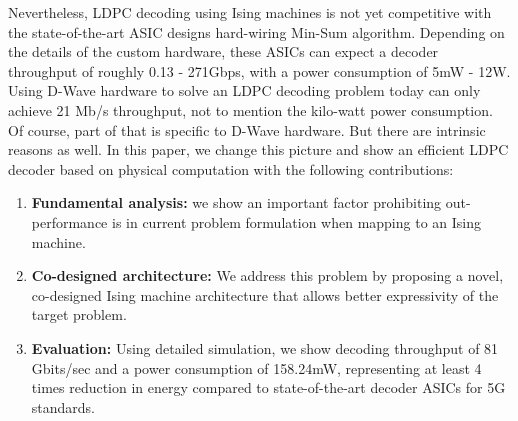 Nevertheless, LDPC decoding using Ising machines is not yet competitive with the state-of-the-art
ASIC designs hard-wiring Min-Sum algorithm.
Depending on the details of the custom hardware, these ASICs can expect a decoder throughput of 
roughly 0.13 - 271Gbps, with a power consumption of 5mW - 12W.
Using D-Wave hardware to solve an LDPC decoding problem today can only
achieve 21 Mb/s throughput, not to mention the kilo-watt power consumption.
Of course, part of that is specific to D-Wave hardware. But there are intrinsic
reasons as well. In this paper, we change this picture and show 
an efficient LDPC decoder based on physical computation
with the following contributions: \begin{enumerate}
\item \textbf{Fundamental analysis:} we show an important factor prohibiting out-performance is in 
current problem formulation when mapping to an Ising machine. 

\item \textbf{Co-designed architecture:} We address this problem by 
proposing a novel, co-designed Ising machine architecture that allows better expressivity of the target problem.

\item \textbf{Evaluation:} Using detailed simulation, we show 
decoding throughput of 81 Gbits/sec and a power consumption of 158.24mW, representing at least 4 times reduction in energy compared to state-of-the-art decoder ASICs for 5G standards.

\end{enumerate}






